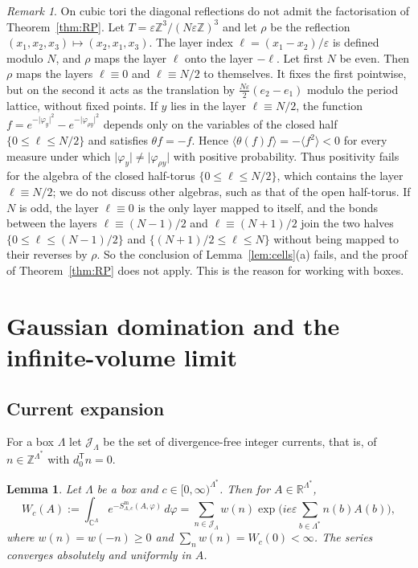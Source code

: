 \documentclass[11pt]{amsart}
\theoremstyle{plain}
\newtheorem{lemma}[theorem]{Lemma}
\theoremstyle{definition}
\theoremstyle{remark}
\newtheorem{remark}[theorem]{Remark}
\numberwithin{equation}{section}
\newcommand{\R}{\mathbb{R}}
\newcommand{\Z}{\mathbb{Z}}
\newcommand{\C}{\mathbb{C}}
\newcommand{\eps}{\varepsilon}
\newcommand{\cJ}{\mathcal{J}}
\newcommand{\abs}[1]{\lvert #1\rvert}
\newcommand{\ev}[1]{\langle #1\rangle}
\begin{document}
\begin{remark}\label{rem:tori}
On cubic tori the diagonal reflections do not admit the factorisation of Theorem~\ref{thm:RP}. Let $T=\eps\Z^3/(N\eps\Z)^3$ and let $\rho$ be the reflection $(x_1,x_2,x_3)\mapsto(x_2,x_1,x_3)$. The layer index $\ell=(x_1-x_2)/\eps$ is defined modulo $N$, and $\rho$ maps the layer $\ell$ onto the layer $-\ell$. Let first $N$ be even. Then $\rho$ maps the layers $\ell\equiv0$ and $\ell\equiv N/2$ to themselves. It fixes the first pointwise, but on the second it acts as the translation by $\frac{N\eps}2(e_2-e_1)$ modulo the period lattice, without fixed points. If $y$ lies in the layer $\ell\equiv N/2$, the function $f=e^{-\abs{\varphi_y}^2}-e^{-\abs{\varphi_{\rho y}}^2}$ depends only on the variables of the closed half $\{0\le\ell\le N/2\}$ and satisfies $\theta f=-f$. Hence $\ev{\theta(f)f}=-\ev{f^2}<0$ for every measure under which $\abs{\varphi_y}\ne\abs{\varphi_{\rho y}}$ with positive probability. Thus positivity fails for the algebra of the closed half-torus $\{0\le\ell\le N/2\}$, which contains the layer $\ell\equiv N/2$; we do not discuss other algebras, such as that of the open half-torus. If $N$ is odd, the layer $\ell\equiv0$ is the only layer mapped to itself, and the bonds between the layers $\ell\equiv(N-1)/2$ and $\ell\equiv(N+1)/2$ join the two halves $\{0\le\ell\le(N-1)/2\}$ and $\{(N+1)/2\le\ell\le N\}$ without being mapped to their reverses by $\rho$. So the conclusion of Lemma~\ref{lem:cells}(a) fails, and the proof of Theorem~\ref{thm:RP} does not apply. This is the reason for working with boxes.
\end{remark}

\section{Gaussian domination and the infinite-volume limit}\label{sec:GD}

\subsection{Current expansion}
For a box $\Lambda$ let $\cJ_\Lambda$ be the set of divergence-free integer currents, that is, of $n\in\Z^{\Lambda^*}$ with $d_0^{\mathsf T}n=0$.

\begin{lemma}\label{lem:current}
Let $\Lambda$ be a box and $c\in[0,\infty)^{\Lambda^*}$. Then for $A\in\R^{\Lambda^*}$,
\[
W_c(A):=\int_{\C^\Lambda}e^{-S^{\mathrm m}_{\Lambda,c}(A,\varphi)}\,d\varphi=\sum_{n\in\cJ_\Lambda}w(n)\exp\Big(ie\eps\sum_{b\in\Lambda^*}n(b)A(b)\Big),
\]
where $w(n)=w(-n)\ge0$ and $\sum_nw(n)=W_c(0)<\infty$. The series converges absolutely and uniformly in $A$.
\end{lemma}
\end{document}
